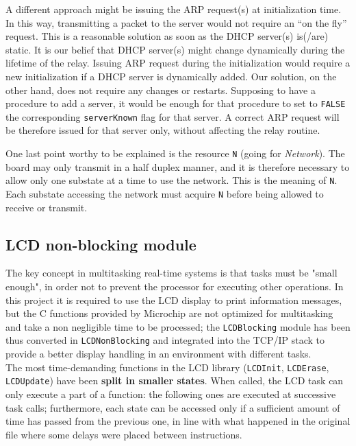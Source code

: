 A different approach might be issuing the ARP request(s) at initialization time. In this way, transmitting a packet to the server would not require an ``on the fly'' request. This is a reasonable solution as soon as the DHCP server(s) is(/are) static. It is our belief that DHCP server(s) might change dynamically during the lifetime of the relay. Issuing ARP request during the initialization would require a new initialization if a DHCP server is dynamically added. Our solution, on the other hand, does not require any changes or restarts. Supposing to have a procedure to add a server, it would be enough for that procedure to set to \texttt{FALSE} the corresponding \texttt{serverKnown} flag for that server. A correct ARP request will be therefore issued for that server only, without affecting the relay routine.

One last point worthy to be explained is the resource \texttt{N} (going for \textit{Network}). The board may only transmit in a half duplex manner, and it is therefore necessary to allow only one substate at a time to use the network. This is the meaning of \texttt{N}. Each substate accessing the network must acquire \texttt{N} before being allowed to receive or transmit. 

\newpage
\subsection{LCD non-blocking module}
The key concept in multitasking real-time systems is that tasks must be "small enough", in order not to prevent the processor for executing other operations.
In this project it is required to use the LCD display to print information messages, but the C functions provided by Microchip are not optimized for multitasking and take a non negligible time to be processed; the \texttt{LCDBlocking} module has been thus converted in \texttt{LCDNonBlocking} and integrated into the TCP/IP stack to provide a better display handling in an environment with different tasks.\\

The most time-demanding functions in the LCD library (\texttt{LCDInit}, \texttt{LCDErase}, \texttt{LCDUpdate}) have been \textbf{split in smaller states}. When called, the LCD task can only execute a part of a function: the following ones are executed at successive task calls; furthermore, each state can be accessed only if a sufficient amount of time has passed from the previous one, in line with what happened in the original file where some delays were placed between instructions.\\

